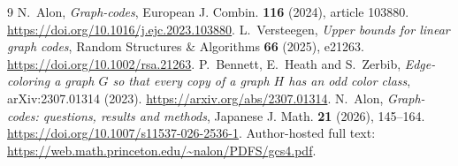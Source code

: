 \documentclass[11pt,a4paper]{article}
\begin{document}
\begin{thebibliography}{9}
 N.~Alon, \emph{Graph-codes}, European J. Combin. \textbf{116} (2024), article 103880. \url{https://doi.org/10.1016/j.ejc.2023.103880}.
 L.~Versteegen, \emph{Upper bounds for linear graph codes}, Random Structures \& Algorithms \textbf{66} (2025), e21263. \url{https://doi.org/10.1002/rsa.21263}.
 P.~Bennett, E.~Heath and S.~Zerbib, \emph{Edge-coloring a graph $G$ so that every copy of a graph $H$ has an odd color class}, arXiv:2307.01314 (2023). \url{https://arxiv.org/abs/2307.01314}.
 N.~Alon, \emph{Graph-codes: questions, results and methods}, Japanese J. Math. \textbf{21} (2026), 145--164. \url{https://doi.org/10.1007/s11537-026-2536-1}. Author-hosted full text: \url{https://web.math.princeton.edu/~nalon/PDFS/gcs4.pdf}.
\end{thebibliography}
\end{document}
